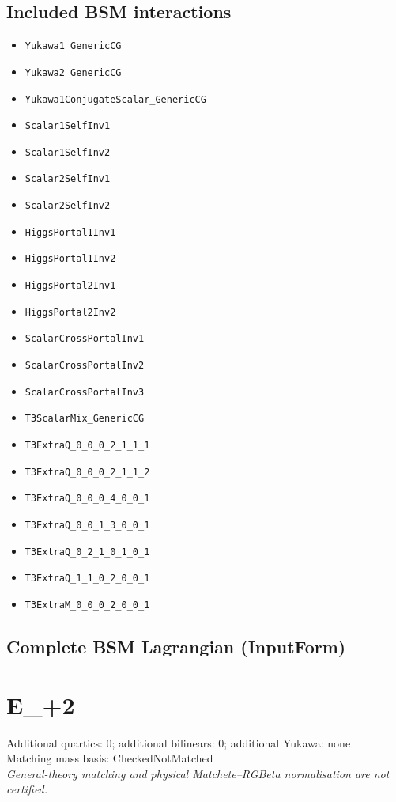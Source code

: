 \documentclass[10pt,a4paper]{article}
\begin{document}
\subsection*{Included BSM interactions}
\begin{itemize}
\item \texttt{Yukawa1\_GenericCG}
\item \texttt{Yukawa2\_GenericCG}
\item \texttt{Yukawa1ConjugateScalar\_GenericCG}
\item \texttt{Scalar1SelfInv1}
\item \texttt{Scalar1SelfInv2}
\item \texttt{Scalar2SelfInv1}
\item \texttt{Scalar2SelfInv2}
\item \texttt{HiggsPortal1Inv1}
\item \texttt{HiggsPortal1Inv2}
\item \texttt{HiggsPortal2Inv1}
\item \texttt{HiggsPortal2Inv2}
\item \texttt{ScalarCrossPortalInv1}
\item \texttt{ScalarCrossPortalInv2}
\item \texttt{ScalarCrossPortalInv3}
\item \texttt{T3ScalarMix\_GenericCG}
\item \texttt{T3ExtraQ\_0\_0\_0\_2\_1\_1\_1}
\item \texttt{T3ExtraQ\_0\_0\_0\_2\_1\_1\_2}
\item \texttt{T3ExtraQ\_0\_0\_0\_4\_0\_0\_1}
\item \texttt{T3ExtraQ\_0\_0\_1\_3\_0\_0\_1}
\item \texttt{T3ExtraQ\_0\_2\_1\_0\_1\_0\_1}
\item \texttt{T3ExtraQ\_1\_1\_0\_2\_0\_0\_1}
\item \texttt{T3ExtraM\_0\_0\_0\_2\_0\_0\_1}
\end{itemize}
\subsection*{Complete BSM Lagrangian (InputForm)}

\clearpage
\section{E\_+2}
Additional quartics: 0; additional bilinears: 0; additional Yukawa: none\\
Matching mass basis: CheckedNotMatched\\
\emph{General-theory matching and physical Matchete--RGBeta normalisation are not certified.}
\end{document}
